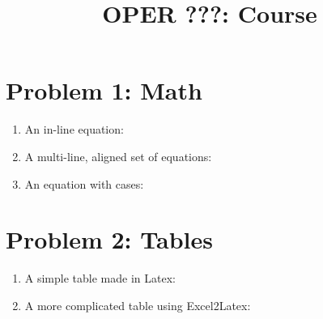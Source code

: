 \documentclass{article}
\title{OPER ???: Course \exerciseset}
\author{\studentname}
\begin{document}
\maketitle

\section*{Problem 1: Math}
\begin{enumerate}
\item %
An in-line equation: %


\item %
A multi-line, aligned set of equations:


\item %
An equation with cases:

\end{enumerate}

\section*{Problem 2: Tables}
\begin{enumerate}

\item %
A simple table made in Latex:



\item %
A more complicated table using Excel2Latex:


\end{enumerate}
\end{document}
